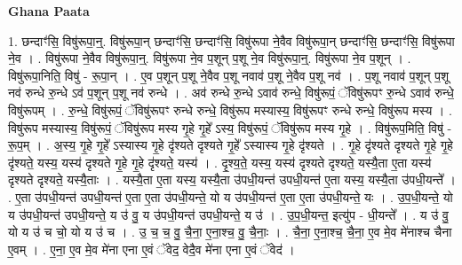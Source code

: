 \documentclass[17pt]{extarticle}
\begin{document}
\textbf{Ghana Paata } \newline

1. छन्दाꣳ॑सि॒ विषु॑रूपा॒न्॒. विषु॑रूपा॒न् छन्दाꣳ॑सि॒ छन्दाꣳ॑सि॒ विषु॑रूपा ने॒वैव विषु॑रूपा॒न् छन्दाꣳ॑सि॒ छन्दाꣳ॑सि॒ विषु॑रूपा ने॒व । . विषु॑रूपा ने॒वैव विषु॑रूपा॒न्॒. विषु॑रूपा ने॒व प॒शून् प॒शू ने॒व विषु॑रूपा॒न्॒. विषु॑रूपा ने॒व प॒शून् । . विषु॑रूपा॒निति॒ विषु॑ - रू॒पा॒न् । . ए॒व प॒शून् प॒शू ने॒वैव प॒शू नवाव॑ प॒शू ने॒वैव प॒शू नव॑ । . प॒शू नवाव॑ प॒शून् प॒शू नव॑ रुन्धे रु॒न्धे ऽव॑ प॒शून् प॒शू नव॑ रुन्धे । . अव॑ रुन्धे रु॒न्धे ऽवाव॑ रुन्धे॒ विषु॑रूपं॒ ॅविषु॑रूपꣳ रु॒न्धे ऽवाव॑ रुन्धे॒ विषु॑रूपम् । . रु॒न्धे॒ विषु॑रूपं॒ ॅविषु॑रूपꣳ रुन्धे रुन्धे॒ विषु॑रूप मस्यास्य॒ विषु॑रूपꣳ रुन्धे रुन्धे॒ विषु॑रूप मस्य । . विषु॑रूप मस्यास्य॒ विषु॑रूपं॒ ॅविषु॑रूप मस्य गृ॒हे गृ॒हे᳚ ऽस्य॒ विषु॑रूपं॒ ॅविषु॑रूप मस्य गृ॒हे । . विषु॑रूप॒मिति॒ विषु॑ - रू॒प॒म् । . अ॒स्य॒ गृ॒हे गृ॒हे᳚ ऽस्यास्य गृ॒हे दृ॑श्यते दृश्यते गृ॒हे᳚ ऽस्यास्य गृ॒हे दृ॑श्यते । . गृ॒हे दृ॑श्यते दृश्यते गृ॒हे गृ॒हे दृ॑श्यते॒ यस्य॒ यस्य॑ दृश्यते गृ॒हे गृ॒हे दृ॑श्यते॒ यस्य॑ । . दृ॒श्य॒ते॒ यस्य॒ यस्य॑ दृश्यते दृश्यते॒ यस्यै॒ता ए॒ता यस्य॑ दृश्यते दृश्यते॒ यस्यै॒ताः । . यस्यै॒ता ए॒ता यस्य॒ यस्यै॒ता उ॑पधी॒यन्त॑ उपधी॒यन्त॑ ए॒ता यस्य॒ यस्यै॒ता उ॑पधी॒यन्ते᳚ । . ए॒ता उ॑पधी॒यन्त॑ उपधी॒यन्त॑ ए॒ता ए॒ता उ॑पधी॒यन्ते॒ यो य उ॑पधी॒यन्त॑ ए॒ता ए॒ता उ॑पधी॒यन्ते॒ यः । . उ॒प॒धी॒यन्ते॒ यो य उ॑पधी॒यन्त॑ उपधी॒यन्ते॒ य उ॑ वु॒ य उ॑पधी॒यन्त॑ उपधी॒यन्ते॒ य उ॑ । . उ॒प॒धी॒यन्त॒ इत्यु॑प - धी॒यन्ते᳚ । . य उ॑ वु॒ यो य उ॑ च चो॒ यो य उ॑ च । . उ॒ च॒ च॒ वु॒ चै॒ना॒ ए॒ना॒श्च॒ वु॒ चै॒नाः॒ । . चै॒ना॒ ए॒ना॒श्च॒ चै॒ना॒ ए॒व मे॒व मे॑नाश्च चैना ए॒वम् । . ए॒ना॒ ए॒व मे॒व मे॑ना एना ए॒वं ॅवेद॒ वेदै॒व मे॑ना एना ए॒वं ॅवेद॑ । \newline
\end{document}
